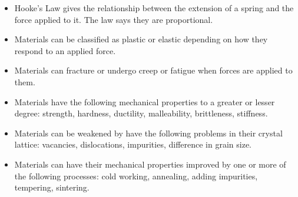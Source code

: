 
\begin{itemize}
\item Hooke's Law gives the relationship between the extension of a spring and the force applied to it. The law says they are proportional.
\item Materials can be classified as plastic or elastic depending on how they respond to an applied force. 
\item Materials can fracture or undergo creep or fatigue when forces are applied to them.
\item Materials have the following mechanical properties to a greater or lesser degree: strength, hardness, ductility, malleability, brittleness, stiffness.
\item Materials can be weakened by have the following problems in their crystal lattice: vacancies, dislocations, impurities, difference in grain size.
\item Materials can have their mechanical properties improved by one or more of the following processes: cold working, annealing, adding impurities, tempering, sintering.
\end{itemize}

